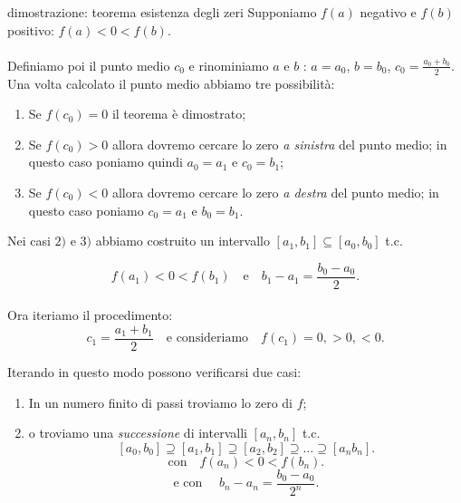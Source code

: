 \documentclass[x11names]{article}
\begin{document}
	\begin{es}{dimostrazione: teorema esistenza degli zeri}
		Supponiamo $f\left(a\right)$ negativo e $f\left(b\right)$ positivo: $f\left(a\right) < 0 < f\left(b\right)$. 
		\\ \\
		Definiamo poi il punto medio $c_0$ e rinominiamo $a$ e  $b$ : $a = a_0$, $b = b_0$, $c_0=\frac{a_0+b_0}{2}$.
		\\
		\noindent
		Una volta calcolato il punto medio abbiamo tre possibilità:
		\begin{enumerate}
			\item Se $f\left(c_0\right) = 0$ il teorema è dimostrato;
			\item Se $f\left(c_0\right) > 0$ allora dovremo cercare lo zero \textit{a sinistra} del punto medio; in questo caso poniamo quindi $a_0 = a_1$ e $c_0=b_1$;
			\item Se $f\left(c_0\right) < 0$ allora dovremo cercare lo zero \textit{a destra} del punto medio; in questo caso poniamo $c_0= a_1$ e $b_0 = b_1$.
		\end{enumerate}
		
		\begin{center}
			
		\end{center}
		Nei casi $2)$ e $3)$ abbiamo costruito un intervallo  $\left[a_1,b_1\right] \subseteq \left[a_0,b_0\right]$ t.c. 
		
		\[
		f\left(a_1\right)<0<f\left(b_1\right) \quad \text{e} \quad b_1-a_1 = \frac{b_0-a_0}{2}
		.\] 
		\\
		\noindent
		Ora iteriamo il procedimento:
		\[
		c_1 = \frac{a_1+b_1}{2} \quad \text{e consideriamo} \quad f\left(c_1\right) = 0, > 0, < 0
		.\] 
		
		Iterando in questo modo possono verificarsi due casi:
		\begin{enumerate}
			\item In un numero finito di passi troviamo lo zero di $f$;
			\item o troviamo una \textit{successione} di intervalli $\left[a_{n},b_{n}\right]$ t.c.
			\[
			\left[a_0,b_0\right] \supseteq \left[a_1,b_1\right] \supseteq \left[a_2,b_2\right] \supseteq \dots \supseteq\left[a_{n}b_{n}\right]
			.\] 
			\[
			\text{con} \quad f\left(a_{n}\right) < 0 < f\left(b_{n}\right)
			.\] 
			\[
			\text{e con } \quad b_{n} - a_{n} = \frac{b_0-a_0}{2^n}
			.\] 
		\end{enumerate}
		

\end{es}
\end{document}

